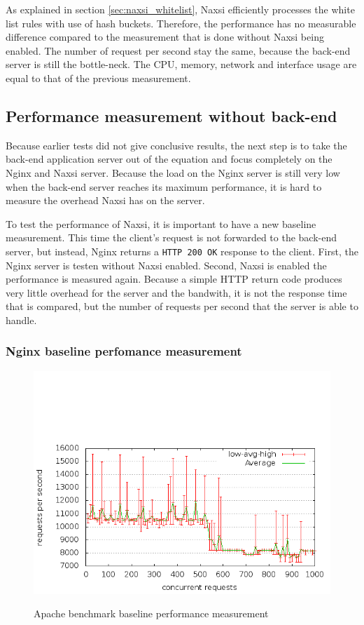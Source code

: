 \documentclass[Measurements]{subfiles}
\begin{document}
As explained in section \ref{sec:naxsi_whitelist}, Naxsi efficiently processes the white list rules with use of hash buckets. Therefore, the performance has no measurable difference compared to the measurement that is done without Naxsi being enabled. The number of request per second stay the same, because the back-end server is still the bottle-neck. The CPU, memory, network and interface usage are equal to that of the previous measurement.

\subsection{Performance measurement without back-end}
Because earlier tests did not give conclusive results, the next step is to take the back-end application server out of the equation and focus completely on the Nginx and Naxsi server. Because the load on the Nginx server is still very low when the back-end server reaches its maximum performance, it is hard to measure the overhead Naxsi has on the server.

To test the performance of Naxsi, it is important to have a new baseline measurement. This time the client's request is not forwarded to the back-end server, but instead, Nginx returns a \verb+HTTP 200 OK+ response to the client. First, the Nginx server is testen without Naxsi enabled. Second, Naxsi is enabled the performance is measured again. Because a simple HTTP return code produces very little overhead for the server and the bandwith, it is not the response time that is compared, but the number of requests per second that the server is able to handle.

\subsubsection{Nginx baseline perfomance measurement}

\begin{figure}[H]
\caption{Apache benchmark baseline performance measurement}
\centering
\includegraphics[scale=0.55] {images/results/200_without_naxsi/output.png}
\label{fig:Baseline performance measurement}
\end{figure}
\end{document}
